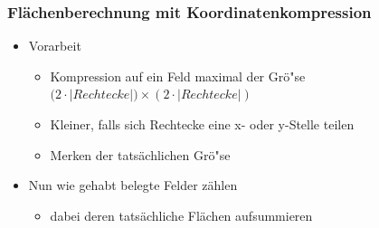 \begin{frame}
	\frametitle{{Fl\"achenberechnung mit Koordinatenkompression}}
		\pause
	\begin{itemize}
		\item Vorarbeit
		\pause
		\begin{itemize}
			\item Kompression auf ein Feld maximal der Gr\"o"se $\mathcal (2 \cdot \left|Rechtecke\right|)\times(2 \cdot \left|Rechtecke\right|)$
			\pause
			\item Kleiner, falls sich Rechtecke eine x- oder y-Stelle teilen
			\pause
			\item Merken der tats\"achlichen Gr\"o"se
		\end{itemize}
		\pause
		\item Nun wie gehabt belegte Felder z\"ahlen
			\pause
		\begin{itemize}
			\item dabei deren tats\"achliche Fl\"achen aufsummieren
		\end{itemize}
	\end{itemize}
\end{frame}
